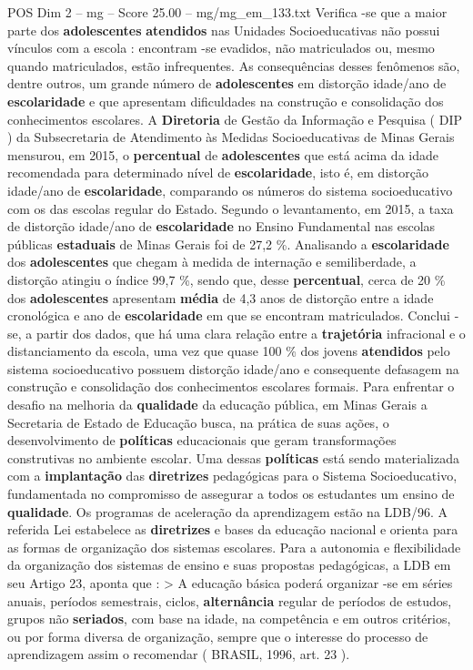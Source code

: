\begin{textsample}{POS Dim 2 – mg – Score 25.00 – mg/mg\_em\_133.txt}
Verifica -se que a maior parte dos \textbf{adolescentes} \textbf{atendidos} nas Unidades Socioeducativas não possui vínculos com a escola : encontram -se evadidos, não matriculados ou, mesmo quando matriculados, estão infrequentes.
As consequências desses fenômenos são, dentre outros, um grande número de \textbf{adolescentes} em distorção idade/ano de \textbf{escolaridade} e que apresentam dificuldades na construção e consolidação dos conhecimentos escolares.
A \textbf{Diretoria} de Gestão da Informação e Pesquisa ( DIP ) da Subsecretaria de Atendimento às Medidas Socioeducativas de Minas Gerais mensurou, em 2015, o \textbf{percentual} de \textbf{adolescentes} que está acima da idade recomendada para determinado nível de \textbf{escolaridade}, isto é, em distorção idade/ano de \textbf{escolaridade}, comparando os números do sistema socioeducativo com os das escolas regular do Estado.
Segundo o levantamento, em 2015, a taxa de distorção idade/ano de \textbf{escolaridade} no Ensino Fundamental nas escolas públicas \textbf{estaduais} de Minas Gerais foi de 27,2 \%.
Analisando a \textbf{escolaridade} dos \textbf{adolescentes} que chegam à medida de internação e semiliberdade, a distorção atingiu o índice 99,7 \%, sendo que, desse \textbf{percentual}, cerca de 20 \% dos \textbf{adolescentes} apresentam \textbf{média} de 4,3 anos de distorção entre a idade cronológica e ano de \textbf{escolaridade} em que se encontram matriculados.
Conclui -se, a partir dos dados, que há uma clara relação entre a \textbf{trajetória} infracional e o distanciamento da escola, uma vez que quase 100 \% dos jovens \textbf{atendidos} pelo sistema socioeducativo possuem distorção idade/ano e consequente defasagem na construção e consolidação dos conhecimentos escolares formais.
Para enfrentar o desafio na melhoria da \textbf{qualidade} da educação pública, em Minas Gerais a Secretaria de Estado de Educação busca, na prática de suas ações, o desenvolvimento de \textbf{políticas} educacionais que geram transformações construtivas no ambiente escolar.
Uma dessas \textbf{políticas} está sendo materializada com a \textbf{implantação} das \textbf{diretrizes} pedagógicas para o Sistema Socioeducativo, fundamentada no compromisso de assegurar a todos os estudantes um ensino de \textbf{qualidade}.
Os programas de aceleração da aprendizagem estão na LDB/96.
A referida Lei estabelece as \textbf{diretrizes} e bases da educação nacional e orienta para as formas de organização dos sistemas escolares.
Para a autonomia e flexibilidade da organização dos sistemas de ensino e suas propostas pedagógicas, a LDB em seu Artigo 23, aponta que : > A educação básica poderá organizar -se em séries anuais, períodos semestrais, ciclos, \textbf{alternância} regular de períodos de estudos, grupos não \textbf{seriados}, com base na idade, na competência e em outros critérios, ou por forma diversa de organização, sempre que o interesse do processo de aprendizagem assim o recomendar ( BRASIL, 1996, art. 23 ).

\end{textsample}
